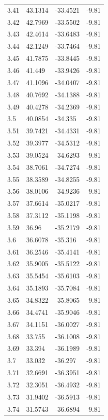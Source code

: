 \begin{tabular}{llll}
3.41 & 43.1314 & -33.4521 & -9.81 \\
3.42 & 42.7969 & -33.5502 & -9.81 \\
3.43 & 42.4614 & -33.6483 & -9.81 \\
3.44 & 42.1249 & -33.7464 & -9.81 \\
3.45 & 41.7875 & -33.8445 & -9.81 \\
3.46 & 41.449 & -33.9426 & -9.81 \\
3.47 & 41.1096 & -34.0407 & -9.81 \\
3.48 & 40.7692 & -34.1388 & -9.81 \\
3.49 & 40.4278 & -34.2369 & -9.81 \\
3.5 & 40.0854 & -34.335 & -9.81 \\
3.51 & 39.7421 & -34.4331 & -9.81 \\
3.52 & 39.3977 & -34.5312 & -9.81 \\
3.53 & 39.0524 & -34.6293 & -9.81 \\
3.54 & 38.7061 & -34.7274 & -9.81 \\
3.55 & 38.3589 & -34.8255 & -9.81 \\
3.56 & 38.0106 & -34.9236 & -9.81 \\
3.57 & 37.6614 & -35.0217 & -9.81 \\
3.58 & 37.3112 & -35.1198 & -9.81 \\
3.59 & 36.96 & -35.2179 & -9.81 \\
3.6 & 36.6078 & -35.316 & -9.81 \\
3.61 & 36.2546 & -35.4141 & -9.81 \\
3.62 & 35.9005 & -35.5122 & -9.81 \\
3.63 & 35.5454 & -35.6103 & -9.81 \\
3.64 & 35.1893 & -35.7084 & -9.81 \\
3.65 & 34.8322 & -35.8065 & -9.81 \\
3.66 & 34.4741 & -35.9046 & -9.81 \\
3.67 & 34.1151 & -36.0027 & -9.81 \\
3.68 & 33.755 & -36.1008 & -9.81 \\
3.69 & 33.394 & -36.1989 & -9.81 \\
3.7 & 33.032 & -36.297 & -9.81 \\
3.71 & 32.6691 & -36.3951 & -9.81 \\
3.72 & 32.3051 & -36.4932 & -9.81 \\
3.73 & 31.9402 & -36.5913 & -9.81 \\
3.74 & 31.5743 & -36.6894 & -9.81 \\

\end{tabular}
